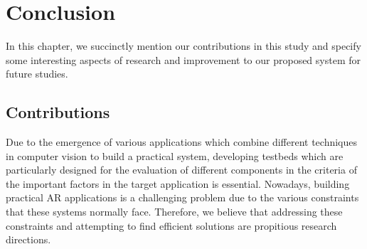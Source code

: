 \chapter{Conclusion}
\label{chap:Conclusion}
In this chapter, we succinctly mention our contributions in this study and specify some interesting aspects of research and improvement to our proposed system 
for future studies.

\section{Contributions}
Due to the emergence of various applications which combine different techniques in computer vision 
to build a practical system, developing testbeds which are particularly designed for the evaluation of different components in the criteria of the important factors
in the target application is essential.
Nowadays, building practical AR applications is a challenging problem due to the various constraints that these systems normally face. Therefore, we believe that
addressing these constraints and attempting to find efficient solutions are propitious research directions.

